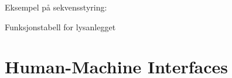 
Eksempel på sekvensstyring:

\begin{center}
\par\end{center}

Funksjonstabell for lysanlegget

\begin{center}
\par\end{center}






























\filbreak
\section{Human-Machine Interfaces}

